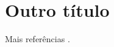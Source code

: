 \documentclass[12pt]{report}
\begin{document}
\clearpage
\linenumbers %
\modulolinenumbers[3] %
\chapter{Outro título}
\lipsum[2-10] 

Mais referências \citep{Rodrigues2016}.



\end{document}
